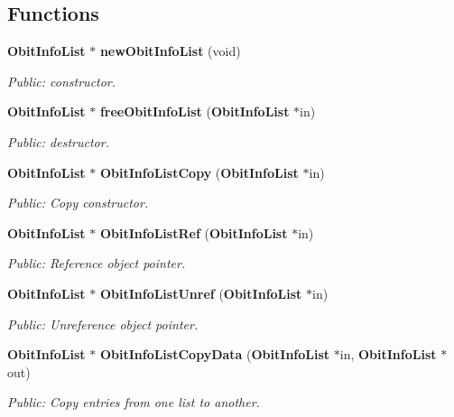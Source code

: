 \subsection*{Functions}
\begin{CompactItemize}
\item 
{\bf Obit\-Info\-List} $\ast$ {\bf new\-Obit\-Info\-List} (void)
\begin{CompactList}\small\item\em Public: constructor. \item\end{CompactList}\item 
{\bf Obit\-Info\-List} $\ast$ {\bf free\-Obit\-Info\-List} ({\bf Obit\-Info\-List} $\ast$in)
\begin{CompactList}\small\item\em Public: destructor. \item\end{CompactList}\item 
{\bf Obit\-Info\-List} $\ast$ {\bf Obit\-Info\-List\-Copy} ({\bf Obit\-Info\-List} $\ast$in)
\begin{CompactList}\small\item\em Public: Copy constructor. \item\end{CompactList}\item 
{\bf Obit\-Info\-List} $\ast$ {\bf Obit\-Info\-List\-Ref} ({\bf Obit\-Info\-List} $\ast$in)
\begin{CompactList}\small\item\em Public: Reference object pointer. \item\end{CompactList}\item 
{\bf Obit\-Info\-List} $\ast$ {\bf Obit\-Info\-List\-Unref} ({\bf Obit\-Info\-List} $\ast$in)
\begin{CompactList}\small\item\em Public: Unreference object pointer. \item\end{CompactList}\item 
{\bf Obit\-Info\-List} $\ast$ {\bf Obit\-Info\-List\-Copy\-Data} ({\bf Obit\-Info\-List} $\ast$in, {\bf Obit\-Info\-List} $\ast$out)
\begin{CompactList}\small\item\em Public: Copy entries from one list to another. \item\end{CompactList}\item 

\end{CompactItemize}

